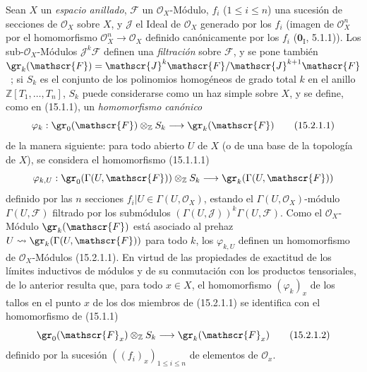 \begin{env}[15.2.1]
\label{0.15.2.1-fr}
Sean $X$ un \emph{espacio anillado}, $\mathscr{F}$ un $\mathcal{O}_X$-Módulo,
$f_i$ ($1\leq i\leq n$) una sucesión de secciones de $\mathcal{O}_X$ sobre
$X$, y $\mathscr{J}$ el Ideal de $\mathcal{O}_X$ generado por los $f_i$
(imagen de $\mathcal{O}_X^n$ por el homomorfismo
$\mathcal{O}_X^n\to\mathcal{O}_X$ definido canónicamente por los $f_i$
($\mathbf{0}_{\mathrm I}$, 5.1.1)). Los sub-$\mathcal{O}_X$-Módulos
$\mathscr{J}^k\mathscr{F}$ definen una \emph{filtración} sobre $\mathscr{F}$, y
se pone también
$\gr_k(\mathscr{F})=\mathscr{J}^k\mathscr{F}/\mathscr{J}^{k+1}\mathscr{F}$~;
si $S_k$ es el conjunto de los polinomios homogéneos de grado total $k$ en
el anillo $\mathbb{Z}[T_1,\ldots,T_n]$, $S_k$ puede considerarse como un
haz simple sobre $X$, y se define, como en (15.1.1), un \emph{homomorfismo
canónico}
\[
\label{0.15.2.1.1-fr}
  \varphi_k:\gr_0(\mathscr{F})\otimes_{\mathbb Z}S_k
  \longrightarrow\gr_k(\mathscr{F})
\tag{15.2.1.1}
\]
de la manera siguiente: para todo abierto $U$ de $X$ (o de una base de la
topología de $X$), se considera el homomorfismo (15.1.1.1)
\[
  \varphi_{k,U}:\gr_0(\Gamma(U,\mathscr{F}))\otimes_{\mathbb Z}S_k
  \longrightarrow\gr_k(\Gamma(U,\mathscr{F}))
\]
definido por las $n$ secciones $f_i|U\in\Gamma(U,\mathcal{O}_X)$, estando el
$\Gamma(U,\mathcal{O}_X)$-módulo $\Gamma(U,\mathscr{F})$ filtrado por los
submódulos $(\Gamma(U,\mathscr{J}))^k\Gamma(U,\mathscr{F})$. Como el
$\mathcal{O}_X$-Módulo $\gr_k(\mathscr{F})$ está asociado al prehaz
$U\leadsto\gr_k(\Gamma(U,\mathscr{F}))$ para todo $k$, los $\varphi_{k,U}$
definen un homomorfismo de $\mathcal{O}_X$-Módulos (15.2.1.1). En virtud
de las propiedades de exactitud de los límites inductivos de módulos y de su
conmutación con los productos tensoriales, de lo anterior resulta que, para
todo $x\in X$, el homomorfismo $(\varphi_k)_x$ de los tallos en el punto $x$
de los dos miembros de (15.2.1.1) se identifica con el homomorfismo de (15.1.1)
\[
\label{0.15.2.1.2-fr}
  \gr_0(\mathscr{F}_x)\otimes_{\mathbb Z}S_k
  \longrightarrow\gr_k(\mathscr{F}_x)
\tag{15.2.1.2}
\]
definido por la sucesión $((f_i)_x)_{1\leq i\leq n}$ de elementos de
$\mathcal{O}_x$.
\end{env}

